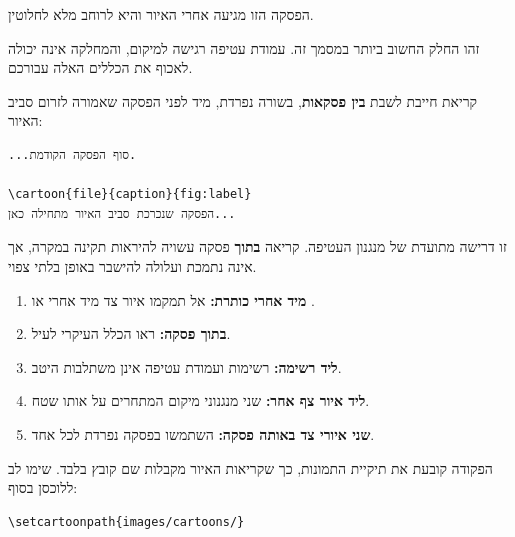 \documentclass{hebrew-academic-template}
\begin{document}
הפסקה הזו מגיעה אחרי האיור והיא לרוחב מלא לחלוטין.



זהו החלק החשוב ביותר במסמך זה. עמודת עטיפה רגישה למיקום, והמחלקה אינה יכולה
לאכוף את הכללים האלה עבורכם.


קריאת  חייבת לשבת \textbf{בין פסקאות}, בשורה
נפרדת, מיד לפני הפסקה שאמורה לזרום סביב האיור:

\begin{english}
\begin{verbatim}
...סוף הפסקה הקודמת.

\cartoon{file}{caption}{fig:label}
הפסקה שנכרכת סביב האיור מתחילה כאן...
\end{verbatim}
\end{english}

זו דרישה מתועדת של מנגנון העטיפה. קריאה \textbf{בתוך} פסקה עשויה להיראות
תקינה במקרה, אך אינה נתמכת ועלולה להישבר באופן בלתי צפוי.


\begin{enumerate}
    \item \textbf{מיד אחרי כותרת:} אל תמקמו איור צד מיד אחרי
           או .
    \item \textbf{בתוך פסקה:} ראו הכלל העיקרי לעיל.
    \item \textbf{ליד רשימה:} רשימות ועמודת עטיפה אינן משתלבות היטב.
    \item \textbf{ליד איור צף אחר:} שני מנגנוני מיקום המתחרים על אותו שטח.
    \item \textbf{שני איורי צד באותה פסקה:} השתמשו בפסקה נפרדת לכל אחד.
\end{enumerate}




הפקודה  קובעת את תיקיית התמונות, כך שקריאות
האיור מקבלות שם קובץ בלבד. שימו לב ללוכסן בסוף:

\begin{english}
\begin{verbatim}
\setcartoonpath{images/cartoons/}
\end{verbatim}
\end{english}
\end{document}

